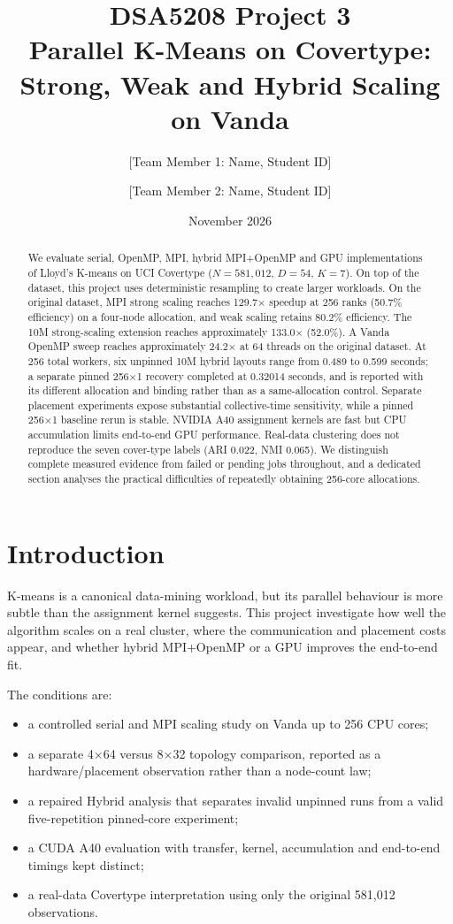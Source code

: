 \documentclass[10pt,a4paper]{article}
\title{\vspace{-1.4cm}\textbf{DSA5208 Project 3}\\Parallel K-Means on Covertype: Strong, Weak and Hybrid Scaling on Vanda}
\author{[Team Member 1: Name, Student ID] \and [Team Member 2: Name, Student ID]}
\date{November 2026}
\begin{document}
\maketitle

\begin{abstract}
We evaluate serial, OpenMP, MPI, hybrid MPI+OpenMP and GPU implementations of Lloyd's K-means on UCI Covertype ($N=581{,}012$, $D=54$, $K=7$). On top of the dataset, this project uses deterministic resampling to create larger workloads. On the original dataset, MPI strong scaling reaches 129.7$\times$ speedup at 256 ranks (50.7\% efficiency) on a four-node allocation, and weak scaling retains 80.2\% efficiency. The 10M strong-scaling extension reaches approximately 133.0$\times$ (52.0\%). A Vanda OpenMP sweep reaches approximately 24.2$\times$ at 64 threads on the original dataset. At 256 total workers, six unpinned 10M hybrid layouts range from 0.489 to 0.599 seconds; a separate pinned 256$\times$1 recovery completed at 0.32014 seconds, and is reported with its different allocation and binding rather than as a same-allocation control. Separate placement experiments expose substantial collective-time sensitivity, while a pinned 256$\times$1 baseline rerun is stable. NVIDIA A40 assignment kernels are fast but CPU accumulation limits end-to-end GPU performance. Real-data clustering does not reproduce the seven cover-type labels (ARI 0.022, NMI 0.065). We distinguish complete measured evidence from failed or pending jobs throughout, and a dedicated section analyses the practical difficulties of repeatedly obtaining 256-core allocations.
\end{abstract}

\section{Introduction}
K-means \citep{lloyd1982,macqueen1967} is a canonical data-mining workload, but its parallel behaviour is
more subtle than the assignment kernel suggests. This project investigate how well the algorithm scales on a
real cluster, where the communication and placement costs appear, and whether
hybrid MPI+OpenMP or a GPU improves the end-to-end fit.

The conditions are:
\begin{itemize}
\item a controlled serial and MPI scaling study on Vanda up to 256 CPU cores;
\item a separate 4$\times$64 versus 8$\times$32 topology comparison, reported
      as a hardware/placement observation rather than a node-count law;
\item a repaired Hybrid analysis that separates invalid unpinned runs from a
      valid five-repetition pinned-core experiment;
\item a CUDA A40 evaluation with transfer, kernel, accumulation and end-to-end
      timings kept distinct;
\item a real-data Covertype interpretation using only the original 581,012
      observations.
\end{itemize}
\end{document}
